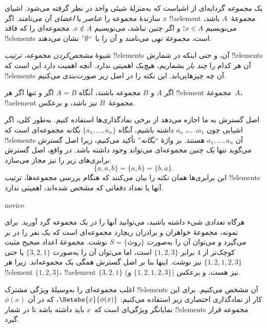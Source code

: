 \documentclass[../../../include/open-logic-section]{subfiles}
\begin{document}

یک \emph{مجموعه} گردایه‌ای از اشیاست که {به‌منزلهٔ} شیئی واحد در
نظر گرفته می‌شود. اشیای سازندهٔ مجموعه را \emph{عناصر} یا
\emph{اعضای} آن می‌نامند. اگر $x$ !!a{element} مجموعهٔ~$A$ باشد،
می‌نویسیم $x \in A$؛ و اگر چنین نباشد، می‌نویسیم $x \notin A$.
مجموعه‌ای را که فاقد !!{element}s است، \emph{مجموعهٔ تهی} می‌نامند و
آن را با~``$\emptyset$'' نشان می‌دهند.

\begin{explain}
شیوهٔ \emph{مشخص‌کردن} مجموعه، \emph{ترتیب} !!{element}s آن، و حتی
اینکه در شمارش !!{element}s آن هر کدام را \emph{چند بار} بشماریم،
هیچ‌یک اهمیتی ندارد. آنچه اهمیت دارد این است که !!{element}s آن چه
چیزهایی‌اند. این نکته را در اصل زیر صورت‌بندی می‌کنیم.
\end{explain}

\begin{defn}
  اگر $A$ و $B$ مجموعه باشند، آنگاه $A = B$ اگر و تنها اگر
  هر !!{element} مجموعهٔ~$A$، !!a{element} مجموعهٔ~$B$ نیز باشد، و
  برعکس.
\end{defn}

اصل گسترش به ما اجازه می‌دهد از برخی نمادگذاری‌ها استفاده کنیم.
به‌طور کلی، اگر اشیایی چون $a_{1}$، \dots، $a_{n}$ داشته باشیم، آنگاه
$\{a_{1}, \dots, a_{n}\}$ \emph{یگانه} مجموعه‌ای است که !!{element}s آن
$a_1, \ldots, a_n$ هستند. بر واژهٔ ``\emph{یگانه}'' تأکید می‌کنیم،
زیرا اصل گسترش می‌گوید تنها \emph{یک} چنین مجموعه‌ای می‌تواند وجود
داشته باشد. در واقع، اصل گسترش برابری‌های زیر را نیز مجاز می‌سازد:
  \[
    \{a, a, b\} = \{a, b\} = \{b,a\}.
  \]
این برابری‌ها همان نکته را بیان می‌کنند که هنگام بررسی مجموعه‌ها،
ترتیب !!{element}s آنها یا تعداد دفعاتی که مشخص شده‌اند، اهمیتی ندارد.

\begin{tagblock}{novice}
\begin{ex}
هرگاه تعدادی شیء داشته باشید، می‌توانید آنها را در یک مجموعه گرد آورید.
برای نمونه، مجموعهٔ خواهران و برادران ریچارد مجموعه‌ای است که یک نفر را
در بر می‌گیرد و می‌توان آن را به‌صورت $S=\{\textrm{روث}\}$ نوشت.
مجموعهٔ اعداد صحیح مثبت کوچک‌تر از $4$ برابر $\{1, 2, 3\}$ است، اما
می‌توان آن را به‌صورت $\{3, 2, 1\}$ یا حتی $\{1, 2, 1, 2, 3\}$ نیز نوشت.
اینها بنا بر اصل گسترش همگی یک مجموعه‌اند. زیرا هر !!{element}
$\{1, 2, 3\}$، !!a{element} $\{3, 2, 1\}$ (و $\{1,
2, 1, 2, 3\}$) نیز هست، و برعکس.
\end{ex}
\end{tagblock}

اغلب مجموعه‌ای را به‌وسیلهٔ ویژگی مشترک !!{element}s آن مشخص می‌کنیم.
برای این کار از نمادگذاری اختصاری زیر استفاده می‌کنیم:
$\Setabs{x}{\phi(x)}$، که در آن $\phi(x)$ نمایانگر ویژگی‌ای است
که~$x$ باید داشته باشد تا در شمار !!{element}s مجموعه قرار گیرد.
\end{document}

